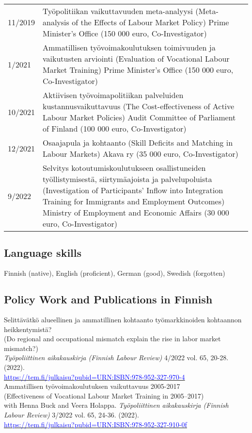 \documentclass[16pt]{article}
\begin{document}
\begin{tabular}{@{}p{1.5in}p{5in}}
11/2019  & Ty\"{o}politiikan vaikuttavuuden meta-analyysi (Meta-analysis of the Effects of Labour Market Policy) Prime Minister's Office (150 000 euro, Co-Investigator) \\
1/2021    & Ammatillisen ty\"{o}voimakoulutuksen toimivuuden ja vaikutusten arviointi (Evaluation of Vocational Labour Market Training) Prime Minister's Office (150 000 euro, Co-Investigator) \\
10/2021  & Aktiivisen työvoimapolitiikan palveluiden kustannusvaikuttavuus (The Cost-effectiveness of Active Labour Market Policies) Audit Committee of Parliament of Finland (100 000 euro, Co-Investigator)\\
12/2021   & Osaajapula ja kohtaanto (Skill Deficits and Matching in Labour Markets) Akava ry (35 000 euro, Co-Investigator)\\
9/2022   & Selvitys kotoutumiskoulutukseen osallistuneiden työllistymisestä, siirtymäajoista ja palvelupoluista (Investigation of Participants' Inflow into Integration Training for Immigrants and Employment Outcomes) Ministry of Employment and Economic Affairs (30 000 euro, Co-Investigator) 
\end{tabular}



\subsection*{Language skills}
Finnish (native), English (proficient), German (good), Swedish (forgotten)

\subsection*{Policy Work and Publications in Finnish}

\noindent Selittävätkö alueellinen ja ammatillinen kohtaanto työmarkkinoiden kohtaannon heikkentymistä?\\
\noindent (Do regional and occupational mismatch explain the rise in labor market mismatch?) \\
\noindent \textit{Työpoliittinen aikakauskirja (Finnish Labour Review)} 4/2022 vol. 65, 20-28.  (2022). \\
\noindent \href{https://tem.fi/julkaisu?pubid=URN:ISBN:978-952-327-970-4}{\textcolor{blue}{https://tem.fi/julkaisu?pubid=URN:ISBN:978-952-327-970-4}} \\

\noindent Ammatillisen työvoimakoulutuksen vaikuttavuus 2005-2017 \\
\noindent (Effectiveness of Vocational Labour Market Training in 2005–2017) \\
\noindent  with Henna Buck and Veera Holappa. \textit{Työpoliittinen aikakauskirja (Finnish Labour Review)} 3/2022 vol. 65, 24-36.  (2022).  \\
\noindent \href{https://tem.fi/julkaisu?pubid=URN:ISBN:978-952-327-910-0}{\textcolor{blue}{https://tem.fi/julkaisu?pubid=URN:ISBN:978-952-327-910-0f}} \\
\end{document}
